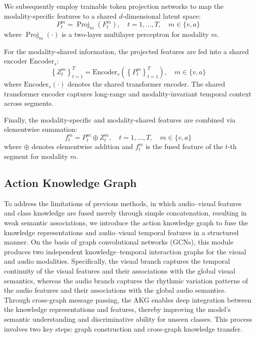 \documentclass[10pt,journal,twoside]{IEEEtran}
\begin{document}
We subsequently employ trainable token projection networks to map the modality-specific features to a shared $d$-dimensional latent space:
\begin{equation}
P_t^m=\operatorname{Proj}_m\left(F_t^m\right),\quad t=1,\ldots,T,\quad m\in\{v,a\}
\end{equation}
where $\operatorname{Proj}_m(\cdot)$ is a two-layer multilayer perceptron for modality $m$.


For the modality-shared information, the projected features are fed into a shared encoder $\text{Encoder}_s$:
\begin{equation}
\left\{Z_t^m\right\}_{t=1}^{T}=\text{Encoder}_s\left(\left\{P_t^m\right\}_{t=1}^{T}\right),\quad m\in\{v,a\}
\end{equation}
where $\text{Encoder}_s(\cdot)$ denotes the shared transformer encoder. The shared transformer encoder\cite{33} captures long-range and modality-invariant temporal context across segments.


Finally, the modality-specific and modality-shared features are combined via elementwise summation:
\begin{equation}
f_t^m=P_t^m\oplus Z_t^m,\quad t=1,\ldots,T,\quad m\in\{v,a\}
\end{equation}
where $\oplus$ denotes elementwise addition and $f_t^m$ is the fused feature of the $t$-th segment for modality $m$.


\subsection{Action Knowledge Graph}
To address the limitations of previous methods, in which audio–visual features and class knowledge are fused merely through simple concatenation, resulting in weak semantic associations, we introduce the action knowledge graph to fuse the knowledge representations and audio–visual temporal features in a structured manner. On the basis of graph convolutional networks (GCNs), this module produces two independent knowledge–temporal interaction graphs for the visual and audio modalities. Specifically, the visual branch captures the temporal continuity of the visual features and their associations with the global visual semantics, whereas the audio branch captures the rhythmic variation patterns of the audio features and their associations with the global audio semantics. Through cross-graph message passing, the AKG enables deep integration between the knowledge representations and features, thereby improving the model’s semantic understanding and discriminative ability for unseen classes. This process involves two key steps: graph construction and cross-graph knowledge transfer.
\end{document}

